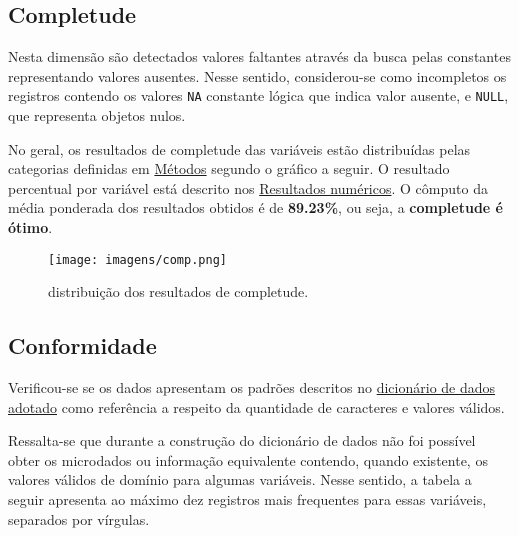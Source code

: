 \documentclass[
  12,
  table]{proadi}
\begin{document}
\hypertarget{completude}{%
\subsection{Completude}\label{completude}}

Nesta dimensão são detectados valores faltantes através da busca pelas
constantes representando valores ausentes. Nesse sentido, considerou-se
como incompletos os registros contendo os valores \texttt{NA} constante
lógica que indica valor ausente, e \texttt{NULL}, que representa objetos
nulos.

No geral, os resultados de completude das variáveis estão distribuídas
pelas categorias definidas em \protect\hyperlink{muxe9todos}{Métodos}
segundo o gráfico a seguir. O resultado percentual por variável está
descrito nos \protect\hyperlink{resultados-numuxe9ricos}{Resultados
numéricos}. O cômputo da média ponderada dos resultados obtidos é de
\textbf{89.23\%}, ou seja, a \textbf{completude é ótimo}.

\begin{figure}
\centering
\texttt{[image: imagens/comp.png]}
\caption{distribuição dos resultados de completude.}
\end{figure}

\hypertarget{conformidade}{%
\subsection{Conformidade}\label{conformidade}}

Verificou-se se os dados apresentam os padrões descritos no
\protect\hyperlink{dicionuxe1rio-adotado}{dicionário de dados adotado}
como referência a respeito da quantidade de caracteres e valores
válidos.

Ressalta-se que durante a construção do dicionário de dados não foi
possível obter os microdados ou informação equivalente contendo, quando
existente, os valores válidos de domínio para algumas variáveis. Nesse
sentido, a tabela a seguir apresenta ao máximo dez registros mais
frequentes para essas variáveis, separados por vírgulas.

\begingroup\fontsize{10}{12}\selectfont
\end{document}
